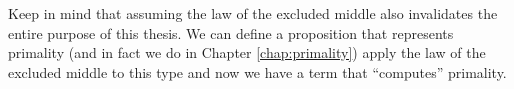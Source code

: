 \documentclass[./Thesis.tex]{subfiles}
\begin{document}
Keep in mind that assuming the law of the excluded middle also invalidates the
entire purpose of this thesis. We can define a proposition that represents
primality (and in fact we do in Chapter \ref{chap:primality}) apply the law of
the excluded middle to this type and now we have a term that ``computes''
primality.
\end{document}
